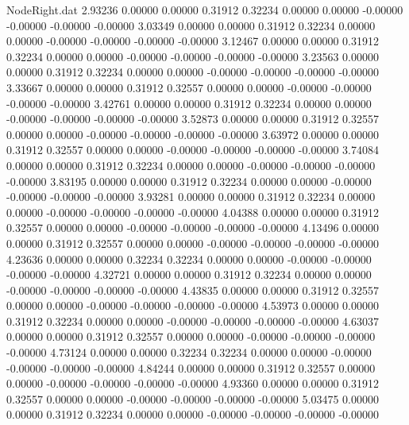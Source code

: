 \begin{filecontents}{NodeRight.dat}
   2.93236    0.00000    0.00000     0.31912    0.32234    0.00000    0.00000   -0.00000   -0.00000   -0.00000   -0.00000
   3.03349    0.00000    0.00000     0.31912    0.32234    0.00000    0.00000   -0.00000   -0.00000   -0.00000   -0.00000
   3.12467    0.00000    0.00000     0.31912    0.32234    0.00000    0.00000   -0.00000   -0.00000   -0.00000   -0.00000
   3.23563    0.00000    0.00000     0.31912    0.32234    0.00000    0.00000   -0.00000   -0.00000   -0.00000   -0.00000
   3.33667    0.00000    0.00000     0.31912    0.32557    0.00000    0.00000   -0.00000   -0.00000   -0.00000   -0.00000
   3.42761    0.00000    0.00000     0.31912    0.32234    0.00000    0.00000   -0.00000   -0.00000   -0.00000   -0.00000
   3.52873    0.00000    0.00000     0.31912    0.32557    0.00000    0.00000   -0.00000   -0.00000   -0.00000   -0.00000
   3.63972    0.00000    0.00000     0.31912    0.32557    0.00000    0.00000   -0.00000   -0.00000   -0.00000   -0.00000
   3.74084    0.00000    0.00000     0.31912    0.32234    0.00000    0.00000   -0.00000   -0.00000   -0.00000   -0.00000
   3.83195    0.00000    0.00000     0.31912    0.32234    0.00000    0.00000   -0.00000   -0.00000   -0.00000   -0.00000
   3.93281    0.00000    0.00000     0.31912    0.32234    0.00000    0.00000   -0.00000   -0.00000   -0.00000   -0.00000
   4.04388    0.00000    0.00000     0.31912    0.32557    0.00000    0.00000   -0.00000   -0.00000   -0.00000   -0.00000
   4.13496    0.00000    0.00000     0.31912    0.32557    0.00000    0.00000   -0.00000   -0.00000   -0.00000   -0.00000
   4.23636    0.00000    0.00000     0.32234    0.32234    0.00000    0.00000   -0.00000   -0.00000   -0.00000   -0.00000
   4.32721    0.00000    0.00000     0.31912    0.32234    0.00000    0.00000   -0.00000   -0.00000   -0.00000   -0.00000
   4.43835    0.00000    0.00000     0.31912    0.32557    0.00000    0.00000   -0.00000   -0.00000   -0.00000   -0.00000
   4.53973    0.00000    0.00000     0.31912    0.32234    0.00000    0.00000   -0.00000   -0.00000   -0.00000   -0.00000
   4.63037    0.00000    0.00000     0.31912    0.32557    0.00000    0.00000   -0.00000   -0.00000   -0.00000   -0.00000
   4.73124    0.00000    0.00000     0.32234    0.32234    0.00000    0.00000   -0.00000   -0.00000   -0.00000   -0.00000
   4.84244    0.00000    0.00000     0.31912    0.32557    0.00000    0.00000   -0.00000   -0.00000   -0.00000   -0.00000
   4.93360    0.00000    0.00000     0.31912    0.32557    0.00000    0.00000   -0.00000   -0.00000   -0.00000   -0.00000
   5.03475    0.00000    0.00000     0.31912    0.32234    0.00000    0.00000   -0.00000   -0.00000   -0.00000   -0.00000

\end{filecontents}
